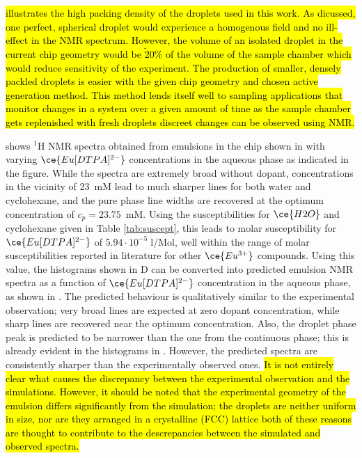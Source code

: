 \hl{ illustrates the high packing density of the droplets used in this work. As dicussed,
one perfect, spherical droplet would experience a homogenous field and no ill-effect in the NMR
spectrum. However, the volume of an isolated droplet in the current chip geometry would be $\tilde20\%$ of the
volume of the sample chamber which would reduce sensitivity of the experiment. The production of smaller, densely
packled droplets is easier with the given chip geometry and chosen active generation method. This method
lends itself well to sampling applications that monitor changes in a system over a given amount of time as
the sample chamber gets replenished with fresh droplets discreet changes can be observed using NMR.}

 shows $^1$H NMR spectra obtained from emulsions in the chip
shown in  with varying $\ce{Eu[DTPA]^{2-}}$ concentrations in the aqueous
phase as indicated in the figure. While the spectra are extremely broad without dopant,
concentrations in the vicinity of 23~mM lead to much sharper lines for both water and cyclohexane,
and the pure phase line widths are recovered at the optimum concentration of $c_p=23.75$~mM.
Using the susceptibilities for $\ce{H2O}$ and cyclohexane given in
Table \ref{tab:suscept}, this leads to molar susceptibility for $\ce{Eu[DTPA]^{2-}}$
of $5.94\cdot 10^{-5}\;\mathrm{l/\text{Mol}}$, well within the range
 of molar susceptibilities reported in literature for other $\ce{Eu^{3+}}$
 compounds. Using this value, the histograms
shown in D can be converted into
predicted emulsion NMR spectra as a function of $\ce{Eu[DTPA]^{2-}}$
concentration in the aqueous phase,
as shown in .
The predicted behaviour is qualitatively similar to the experimental observation; very broad
lines are expected at zero dopant concentration, while sharp lines are recovered near the optimum
concentration. Also, the droplet phase peak is predicted to be narrower than the one from the continuous phase; this is already evident
in the histograms in .  However, the predicted spectra are consistently sharper than the experimentally
observed ones.
\hl{It is not entirely clear what causes the discrepancy between the experimental observation
and the simulations. However, it should be noted that the experimental geometry of the emulsion
differs significantly from the simulation; the droplets are neither uniform in size, nor are they
arranged in a crystalline (FCC) lattice both of these reasons are thought to contribute to the
descrepancies between the simulated and observed spectra.}



